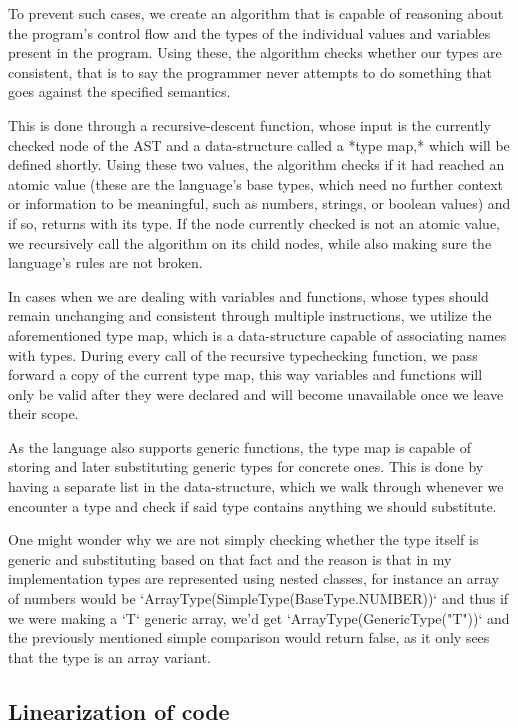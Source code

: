 \documentclass[conference]{IEEEtran}
\begin{document}
To prevent such cases, we create an algorithm that is capable of reasoning about the program's control flow and the types of the individual values and variables present in the program. Using these, the algorithm checks whether our types are consistent, that is to say the programmer never attempts to do something that goes against the specified semantics.

This is done through a recursive-descent function, whose input is the currently checked node of the AST and a data-structure called a *type map,* which will be defined shortly. Using these two values, the algorithm checks if it had reached an atomic value (these are the language's base types, which need no further context or information to be meaningful, such as numbers, strings, or boolean values) and if so, returns with its type. If the node currently checked is not an atomic value, we recursively call the algorithm on its child nodes, while also making sure the language's rules are not broken.

In cases when we are dealing with variables and functions, whose types should remain unchanging and consistent through multiple instructions, we utilize the aforementioned type map, which is a data-structure capable of associating names with types. During every call of the recursive typechecking function, we pass forward a copy of the current type map, this way variables and functions will only be valid after they were declared and will become unavailable once we leave their scope.

As the language also supports generic functions, the type map is capable of storing and later substituting generic types for concrete ones. This is done by having a separate list in the data-structure, which we walk through whenever we encounter a type and check if said type contains anything we should substitute.

One might wonder why we are not simply checking whether the type itself is generic and substituting based on that fact and the reason is that in my implementation types are represented using nested classes, for instance an array of numbers would be `ArrayType(SimpleType(BaseType.NUMBER))` and thus if we were making a `T` generic array, we'd get `ArrayType(GenericType("T"))` and the previously mentioned simple comparison would return false, as it only sees that the type is an array variant.

\subsection{Linearization of code}
\end{document}
